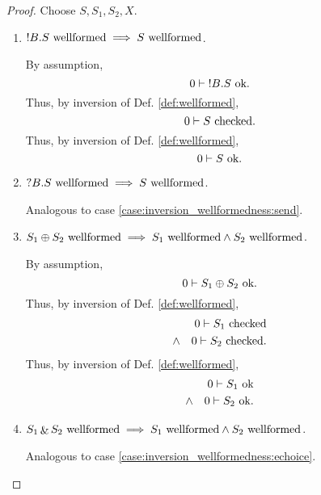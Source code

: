 \documentclass{llncs}
\newcommand*{\send}{\mathord{!}}
\newcommand*{\recv}{\mathord{?}}
\newcommand*{\echoice}{\oplus}
\newcommand*{\ichoice}{\mathop{\&}}
\newcommand*{\wf}[1]{\text{$#1$ {\normalfont \rmfamily wellformed}}}
\newcommand*{\envimpl}       [2]{#1 \vdash #2}
\newcommand*{\envimplchecked}[2]{\envimpl{#1}{\text{$#2$ {\normalfont \rmfamily checked}}}}
\newcommand*{\envimplok}     [2]{\envimpl{#1}{\text{$#2$ {\normalfont \rmfamily ok}}}}
\renewcommand*{\|}{\;|\;}
\begin{document}
\begin{proof}
  Choose $S, S_1, S_2, X$.
  \begin{enumerate}
    \item
      \label{case:inversion_wellformedness:send}
      $\wf{\send B.S} \implies \wf{S}$.

      By assumption,
      \begin{equation*}
        \envimplok{0}{\send B.S}.
      \end{equation*}
      Thus, by inversion of Def. \ref{def:wellformed},
      \begin{equation*}
        \envimplchecked{0}{S}.
      \end{equation*}
      Thus, by inversion of Def. \ref{def:wellformed},
      \begin{equation*}
        \envimplok{0}{S}.
      \end{equation*}

    \item
      \label{case:inversion_wellformedness:recv}
      $\wf{\recv B.S} \implies \wf{S}$.

      Analogous to case \ref{case:inversion_wellformedness:send}.

    \item
      \label{case:inversion_wellformedness:echoice}
      $\wf{S_1 \echoice S_2} \implies \wf{S_1} \land \wf{S_2}$.

      By assumption,
      \begin{equation*}
        \envimplok{0}{S_1 \echoice S_2}.
      \end{equation*}
      Thus, by inversion of Def. \ref{def:wellformed},
      \begin{eqnarray*}
        &&      \envimplchecked{0}{S_1} \\
        &\land& \envimplchecked{0}{S_2}.
      \end{eqnarray*}
      Thus, by inversion of Def. \ref{def:wellformed},
      \begin{eqnarray*}
        &&      \envimplok{0}{S_1} \\
        &\land& \envimplok{0}{S_2}.
      \end{eqnarray*}

    \item
      \label{case:inversion_wellformedness:ichoice}
      $\wf{S_1 \ichoice S_2} \implies \wf{S_1} \land \wf{S_2}$.

      Analogous to case \ref{case:inversion_wellformedness:echoice}.


\end{enumerate}
\end{proof}
\end{document}
